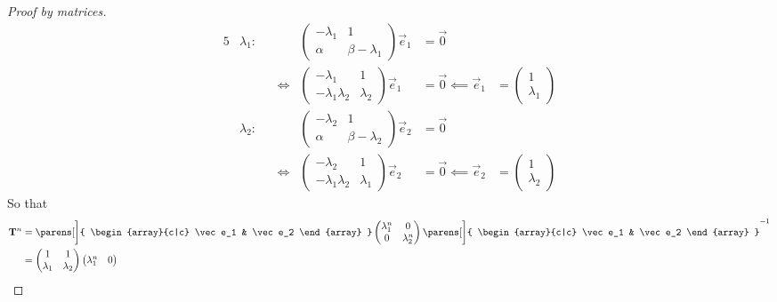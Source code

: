 \begin{proof}[Proof by matrices]
 \begin{alignat*}5
  & \lambda_1 \colon&
  &&
   \begin{pmatrix}
    -\lambda_1 & 1 \\
    \alpha & \beta - \lambda_1
   \end{pmatrix} \vec e_1 &= \vec 0 \\
  && &\iff{}&
   \begin{pmatrix}
    -\lambda_1 & 1 \\
    -\lambda_1 \lambda_2 & \lambda_2
   \end{pmatrix} \vec e_1 &= \vec 0 \impliedby \vec e_1 &{}=
   \begin{pmatrix}
    1 \\
    \lambda_1
   \end{pmatrix} \\
  & \lambda_2 \colon&
  &&
   \begin{pmatrix}
    -\lambda_2 & 1 \\
    \alpha & \beta - \lambda_2
   \end{pmatrix} \vec e_2 &= \vec 0 \\
  && &\iff{}&
   \begin{pmatrix}
    -\lambda_2 & 1 \\
    -\lambda_1 \lambda_2 & \lambda_1
   \end{pmatrix} \vec e_2 &= \vec 0 \impliedby \vec e_2 &{}=
   \begin{pmatrix}
    1 \\
    \lambda_2
   \end{pmatrix}
 \end{alignat*}
 So that
 \begin{align*}
  \mat T^n &=
  \parens[\bigg]{
   \begin{array}{c|c}
    \vec e_1 & \vec e_2
   \end{array}
  }
  \begin{pmatrix}
   \lambda_1^n & 0 \\
   0 & \lambda_2^n
  \end{pmatrix}
  \parens[\bigg]{
   \begin{array}{c|c}
    \vec e_1 & \vec e_2
   \end{array}
  }^{-1} \\
  &=
  \begin{pmatrix}
   1 & 1 \\
   \lambda_1 & \lambda_2
  \end{pmatrix}
  \begin{pmatrix}
   \lambda_1^n & 0 \\

\end{pmatrix}
\end{align*}
\end{proof}
